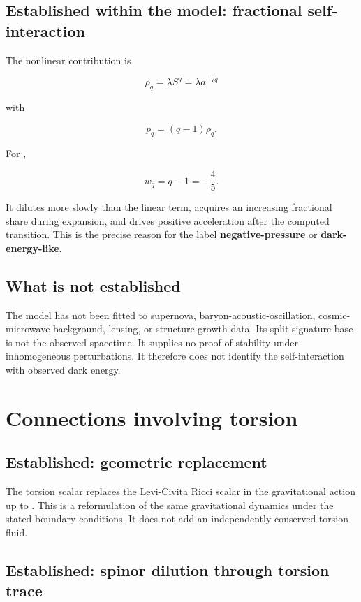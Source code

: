 \documentclass[11pt]{article}
\begin{document}
\subsection{Established within the model: fractional self-interaction}

The nonlinear contribution is

\[
\rho_q=\lambda S^q=\lambda a^{-7q}
\]

with

\[
p_q=(q-1)\rho_q.
\]

For \texttt{},

\[
w_q=q-1=-\frac45.
\]

It dilutes more slowly than the linear term, acquires an increasing fractional share during expansion, and drives positive acceleration after the computed transition. This is the precise reason for the label \textbf{negative-pressure} or \textbf{dark-energy-like}.

\subsection{What is not established}

The model has not been fitted to supernova, baryon-acoustic-oscillation, cosmic-microwave-background, lensing, or structure-growth data. Its split-signature base is not the observed \texttt{} spacetime. It supplies no proof of stability under inhomogeneous perturbations. It therefore does not identify the self-interaction with observed dark energy.

\section{Connections involving torsion}

\subsection{Established: geometric replacement}

The torsion scalar replaces the Levi-Civita Ricci scalar in the gravitational action up to \texttt{}. This is a reformulation of the same gravitational dynamics under the stated boundary conditions. It does not add an independently conserved torsion fluid.

\subsection{Established: spinor dilution through torsion trace}
\end{document}
